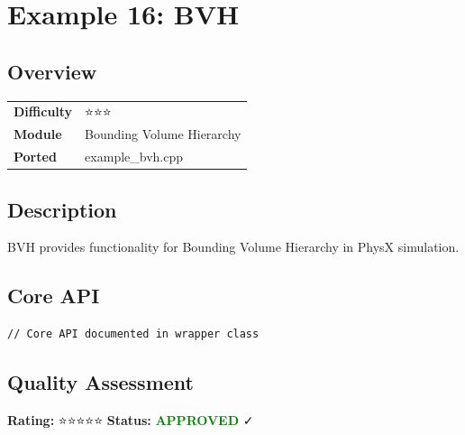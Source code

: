 \section{Example 16: BVH}
\subsection{Overview}
\begin{table}[h]
\centering
\begin{tabular}{|l|l|}
\hline
\textbf{Difficulty} & ⭐⭐⭐ \\
\textbf{Module} & Bounding Volume Hierarchy \\
\textbf{Ported} & example\_bvh.cpp \\
\hline
\end{tabular}
\end{table}

\subsection{Description}
BVH provides functionality for Bounding Volume Hierarchy in PhysX simulation.

\subsection{Core API}
\begin{lstlisting}
// Core API documented in wrapper class
\end{lstlisting}

\subsection{Quality Assessment}
\textbf{Rating:} ⭐⭐⭐⭐⭐ \quad \textbf{Status:} \textcolor{green}{\textbf{APPROVED}} ✓
